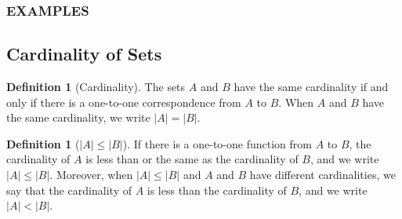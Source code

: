 \documentclass[letterpaper,10pt]{article}
\theoremstyle{plain}
\theoremstyle{definition}
\newtheorem{defn}[thm]{Definition}
\theoremstyle{remark}
\begin{document}
\subsubsection{EXAMPLES}
\newpage
\subsection{Cardinality of Sets}
\begin{defn}[Cardinality]
The sets $A$ and $B$ have the same cardinality if and only if there is a one-to-one correspondence from $A$ to $B$. When $A$ and $B$ have the same cardinality, we write $|A| = |B|$.

\end{defn}
\begin{defn}[$|A| \leq |B|$]
If there is a one-to-one function from $A$ to $B$, the cardinality of $A$ is less than or the same as the cardinality of $B$, and we write $|A| \leq |B|$. Moreover, when $|A| \leq |B|$ and $A$ and $B$ have different cardinalities, we say that the cardinality of $A$ is less than the cardinality of $B$, and we write $|A| < |B|$.
\end{defn}
\end{document}
